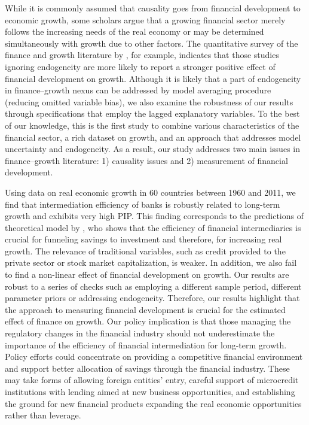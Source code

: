 \begin{refsection}
While it is commonly assumed that causality goes from financial development to economic growth, some scholars argue that a growing financial sector merely follows the increasing needs of the real economy or may be determined simultaneously with growth due to other factors. The quantitative survey of the finance and growth literature by \textcite{Valickovaetal2014}, for example, indicates that those studies ignoring endogeneity are more likely to report a stronger positive effect of financial development on growth. Although it is likely that a part of endogeneity in finance--growth nexus can be addressed by model averaging procedure (reducing omitted variable bias), we also examine the robustness of our results through specifications that employ the lagged explanatory variables. To the best of our knowledge, this is the first study to combine various characteristics of the financial sector, a rich dataset on growth, and an approach that addresses model uncertainty and endogeneity. As a result, our study addresses two main issues in finance--growth literature: 1) causality issues and 2) measurement of financial development.

Using data on real economic growth in 60 countries between 1960 and 2011, we find that intermediation efficiency of banks is robustly related to long-term growth and exhibits very high \ac{PIP}. This finding corresponds to the predictions of theoretical model by \textcite{Pagano1993}, who shows that the efficiency of financial intermediaries is crucial for funneling savings to investment and therefore, for increasing real growth. The relevance of traditional variables, such as credit provided to the private sector or stock market capitalization, is weaker. In addition, we also fail to find a non-linear effect of financial development on growth.  Our results are robust to a series of checks such as employing a different sample period, different parameter priors or addressing endogeneity. Therefore, our results highlight that the approach to measuring financial development is crucial for the estimated effect of finance on growth. Our policy implication is that those managing the regulatory changes in the financial industry should not underestimate the importance of the efficiency of financial intermediation for long-term growth. Policy efforts could concentrate on providing a competitive financial environment and support better allocation of savings through the financial industry. These may take forms of allowing foreign entities' entry, careful support of microcredit institutions with lending aimed at new business opportunities, and establishing the ground for new financial products expanding the real economic opportunities rather than leverage.


\end{refsection}
